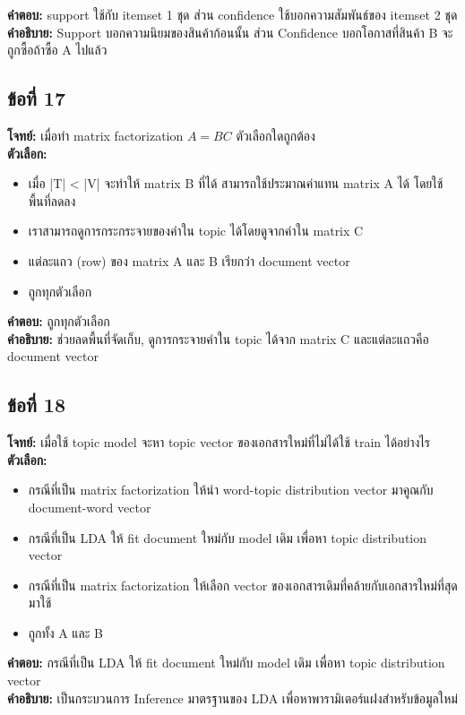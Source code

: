 \documentclass[12pt]{article}
\begin{document}
\textbf{คำตอบ:} support ใช้กับ itemset 1 ชุด ส่วน confidence ใช้บอกความสัมพันธ์ของ itemset 2 ชุด\\
\textbf{คำอธิบาย:} Support บอกความนิยมของสินค้าก้อนนั้น ส่วน Confidence บอกโอกาสที่สินค้า B จะถูกซื้อถ้าซื้อ A ไปแล้ว

\subsection*{ข้อที่ 17}
\textbf{โจทย์:} เมื่อทำ matrix factorization $A = BC$ ตัวเลือกใดถูกต้อง\\
\textbf{ตัวเลือก:}
\begin{itemize}
    \item เมื่อ |T| < |V| จะทำให้ matrix  B ที่ได้ สามารถใช้ประมาณค่าแทน matrix A ได้ โดยใช้พื้นที่ลดลง
    \item เราสามารถดูการกระกระจายของคำใน topic ได้โดยดูจากค่าใน matrix C
    \item แต่ละแถว (row) ของ matrix A และ B เรียกว่า document vector
    \item ถูกทุกตัวเลือก
\end{itemize}

\textbf{คำตอบ:} ถูกทุกตัวเลือก\\
\textbf{คำอธิบาย:} ช่วยลดพื้นที่จัดเก็บ, ดูการกระจายคำใน topic ได้จาก matrix C และแต่ละแถวคือ document vector

\subsection*{ข้อที่ 18}
\textbf{โจทย์:} เมื่อใช้ topic model จะหา topic vector ของเอกสารใหม่ที่ไม่ได้ใช้ train ได้อย่างไร\\
\textbf{ตัวเลือก:}
\begin{itemize}
    \item กรณีที่เป็น matrix factorization ให้นำ word-topic distribution vector มาคูณกับ document-word vector
    \item กรณีที่เป็น LDA ให้ fit document ใหม่กับ model เดิม เพื่อหา topic distribution vector
    \item กรณีที่เป็น matrix factorization ให้เลือก vector ของเอกสารเดิมที่คล้ายกับเอกสารใหม่ที่สุดมาใช้
    \item ถูกทั้ง A และ B
\end{itemize}

\textbf{คำตอบ:} กรณีที่เป็น LDA ให้ fit document ใหม่กับ model เดิม เพื่อหา topic distribution vector\\
\textbf{คำอธิบาย:} เป็นกระบวนการ Inference มาตรฐานของ LDA เพื่อหาพารามิเตอร์แฝงสำหรับข้อมูลใหม่
\end{document}
